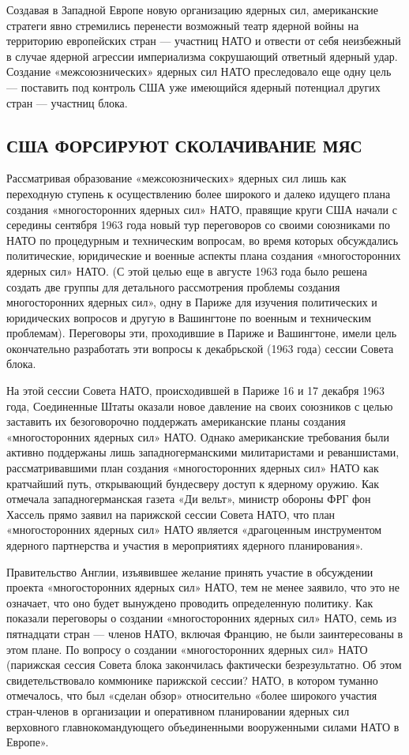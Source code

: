 \documentclass[12pt, a4paper, openany]{book}
\begin{document}
	Создавая в Западной Европе новую организацию ядерных сил, американские стратеги явно стремились перенести возможный театр ядерной войны на территорию европейских стран — участниц НАТО и отвести от себя неизбежный в случае ядерной агрессии империализма сокрушающий ответный ядерный удар. Создание «межсоюзнических» ядерных сил НАТО преследовало еще одну цель — поставить под контроль США уже имеющийся ядерный потенциал других стран — участниц блока.
	

	\subsection[США форсируют сколачивание МЯС]{\center США ФОРСИРУЮТ СКОЛАЧИВАНИЕ МЯС}	
	
	Рассматривая образование «межсоюзнических» ядерных сил лишь как переходную ступень к осуществлению более широкого и далеко идущего плана создания «многосторонних ядерных сил» НАТО, правящие круги США начали с середины сентября 1963 года новый тур переговоров со своими союзниками по НАТО по процедурным и техническим вопросам, во время которых обсуждались политические, юридические и военные аспекты плана создания «многосторонних ядерных сил» НАТО. (С этой целью еще в августе 1963 года было решена создать две группы для детального рассмотрения проблемы создания многосторонних ядерных сил», одну в Париже для изучения политических и юридических вопросов и другую в Вашингтоне по военным и техническим проблемам). Переговоры эти, проходившие в Париже и Вашингтоне, имели цель окончательно разработать эти вопросы к декабрьской (1963 года) сессии Совета блока.
	
	На этой сессии Совета НАТО, происходившей в Париже 16 и 17 декабря 1963 года, Соединенные Штаты оказали новое давление на своих союзников с целью заставить их безоговорочно поддержать американские планы создания «многосторонних ядерных сил» НАТО. Однако американские требования были активно поддержаны лишь западногерманскими милитаристами и реваншистами, рассматривавшими план создания «многосторонних ядерных сил» НАТО как кратчайший путь, открывающий бундесверу доступ к ядерному оружию. Как отмечала западногерманская газета «Ди вельт», министр обороны ФРГ фон Хассель прямо заявил на парижской сессии Совета НАТО, что план «многосторонних ядерных сил» НАТО является «драгоценным инструментом ядерного партнерства и участия в мероприятиях ядерного планирования».
	
	Правительство Англии, изъявившее желание принять участие в обсуждении проекта «многосторонних ядерных сил» НАТО, тем не менее заявило, что это не означает, что оно будет вынуждено проводить определенную политику. Как показали переговоры о создании «многосторонних ядерных сил» НАТО, семь из пятнадцати стран — членов НАТО, включая Францию, не были заинтересованы в этом плане. По вопросу о создании «многосторонних ядерных сил» НАТО (парижская сессия Совета блока закончилась фактически безрезультатно. Об этом свидетельствовало коммюнике парижской сессии? НАТО, в котором туманно отмечалось, что был «сделан обзор» относительно «более широкого участия стран-членов в организации и оперативном планировании ядерных сил верховного главнокомандующего объединенными вооруженными силами НАТО в Европе».
	
\end{document}
